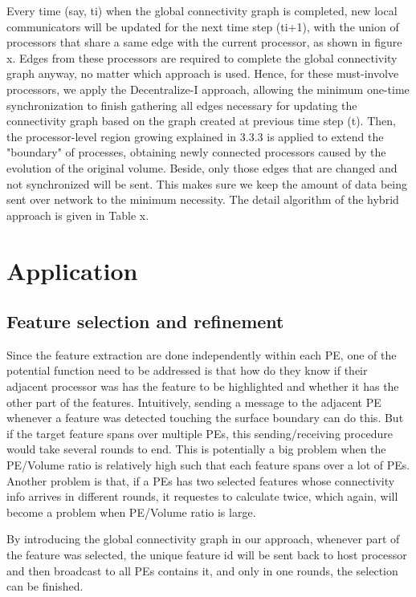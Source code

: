 \documentclass[10pt, conference, compsocconf]{IEEEtran}
\begin{document}
Every time (say, ti) when the global connectivity graph is completed, new local communicators will be updated for the next time step (ti+1), with the union of processors that share a same edge with the current processor, as shown in figure x. Edges from these processors are required to complete the global connectivity graph anyway, no matter which approach is used. Hence, for these must-involve processors, we apply the Decentralize-I approach, allowing the minimum one-time synchronization to finish gathering all edges necessary for updating the connectivity graph based on the graph created at previous time step (t). Then, the processor-level region growing explained in 3.3.3 is applied to extend the "boundary" of processes, obtaining newly connected processors caused by the evolution of the original volume. Beside, only those edges that are changed and not synchronized will be sent. This makes sure we keep the amount of data being sent over network to the minimum necessity.
The detail algorithm of the hybrid approach is given in Table x.

\section{Application}

\subsection{Feature selection and refinement}
Since the feature extraction are done independently within each PE, one of the potential function need to be addressed is that how do they know if their adjacent processor was has the feature to be highlighted and whether it has the other part of the features. Intuitively, sending a message to the adjacent PE whenever a feature was detected touching the surface boundary can do this. But if the target feature spans over multiple PEs, this sending/receiving procedure would take several rounds to end. This is potentially a big problem when the PE/Volume ratio is relatively high such that each feature spans over a lot of PEs. Another problem is that, if a PEs has two selected features whose connectivity info arrives in different rounds, it requestes to calculate twice, which again, will become a problem when PE/Volume ratio is large.

By introducing the global connectivity graph in our approach, whenever part of the feature was selected, the unique feature id will be sent back to host processor and then broadcast to all PEs contains it, and only in one rounds, the selection can be finished.
\end{document}
